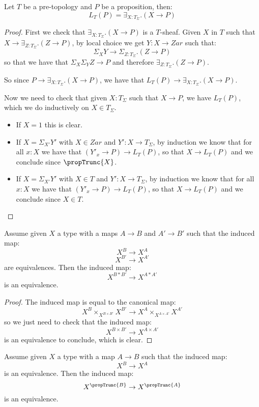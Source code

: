\begin{lemma}\label{Tsigma-proposition}
Let $T$ be a pre-topology and $P$ be a proposition, then:
\[L_T(P) = \exists_{X:T_\Sigma}. (X\to P)\]
\end{lemma}

\begin{proof}
First we check that $\exists_{X:T_\Sigma}. (X\to P)$ is a $T$-sheaf. Given $X$ in $T$ such that $X\to \exists_{Z:T_\Sigma}. (Z\to P)$, by local choice we get $Y:X\to Zar$ such that:
\[\Sigma_XY\to \Sigma_{Z:T_\Sigma}.(Z\to P)\]
so that we have that $\Sigma_X\Sigma_YZ\to P$ and therefore $\exists_{Z:T_\Sigma}.(Z\to P)$.

So since $P\to \exists_{X:T_\Sigma}. (X\to P)$, we have that $L_T(P)\to \exists_{X:T_\Sigma}. (X\to P)$.

Now we need to check that given $X:T_\Sigma$ such that $X\to P$, we have $L_T(P)$, which we do inductively on $X\in T_\Sigma$.
\begin{itemize}
\item If $X=1$ this is clear.
\item If $X=\Sigma_{X'}Y'$ with $X\in Zar$ and $Y':X\to T_\Sigma$, by induction we know that for all $x:X$ we have that $(Y'_x\to P)\to L_T(P)$, so that $X\to L_T(P)$ and we conclude since $\propTrunc{X}$.
\item If $X=\Sigma_{X'}Y'$ with $X\in T$ and $Y':X\to T_\Sigma$, by induction we know that for all $x:X$ we have that $(Y'_x\to P)\to L_T(P)$, so that $X\to L_T(P)$ and we conclude since $X\in T$.
\end{itemize}
\end{proof}

\begin{lemma}\label{localisation-stable-join}
Assume given $X$ a type with a maps $A\to B$ and $A'\to B'$ such that the induced map:
\[X^B\to X^A\]
\[X^{B'}\to X^{A'}\]
are equivalences. Then the induced map:
\[X^{B*B'}\to X^{A*A'}\]
is an equivalence.
\end{lemma}

\begin{proof}
The induced map is equal to the canonical map:
\[X^B\times_{X^{B\times B'}}X^{B'}\to X^A\times_{X^{A\times A'}}X^{A'}\]
so we just need to check that the induced map:
\[X^{B\times B'}\to X^{A\times A'}\]
is an equivalence to conclude, which is clear.
\end{proof}

\begin{lemma}\label{localisation-stable-trucnation}
Assume given $X$ a type with a map $A\to B$ such that the induced map:
\[X^B\to X^A\]
is an equivalence. Then the induced map:
\[X^{\propTrunc{B}}\to X^{\propTrunc{A}}\]
is an equivalence.
\end{lemma}

